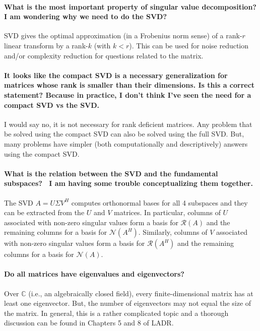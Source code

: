 \documentclass[10pt,english]{article}
\begin{document}
\paragraph{What is the most important property of singular value decomposition? I am wondering why we need to do the SVD?}

SVD gives the optimal approximation (in a Frobenius norm sense) of a rank-$r$ linear transform by a rank-$k$ (with $k<r$).
This can be used for noise reduction and/or complexity reduction for questions related to the matrix.

  


\paragraph{It looks like the compact SVD is a necessary generalization for matrices whose rank is smaller than their dimensions. Is this a correct statement? Because in practice, I don't think I've seen the need for a compact SVD vs the SVD.}

I would say no, it is not necessary for rank deficient matrices.
Any problem that be solved using the compact SVD can also be solved using the full SVD.
But, many problems have simpler (both computationally and descriptively) answers using the compact SVD.


\paragraph{What is the relation between the SVD and the fundamental subspaces?  I am having some trouble conceptualizing them together.}

The SVD $A = U\Sigma V^H$ computes orthonormal bases for all 4 subspaces and they can be extracted from the $U$ and $V$ matrices.
In particular, columns of $U$ associated with non-zero singular values form a basis for $\mathcal{R}(A)$ and the remaining columns for a basis for $\mathcal{N}(A^H)$.
Similarly, columns of $V$ associated with non-zero singular values form a basis for $\mathcal{R}(A^H)$ and the remaining columns for a basis for $\mathcal{N}(A)$.

\paragraph{Do all matrices have eigenvalues and eigenvectors?}

Over $\mathbb{C}$ (i.e., an algebraically closed field), every finite-dimensional matrix has at least one eigenvector.
But, the number of eigenvectors may not equal the size of the matrix.
In general, this is a rather complicated topic and a thorough discussion can be found in Chapters 5 and 8 of LADR.
\end{document}
